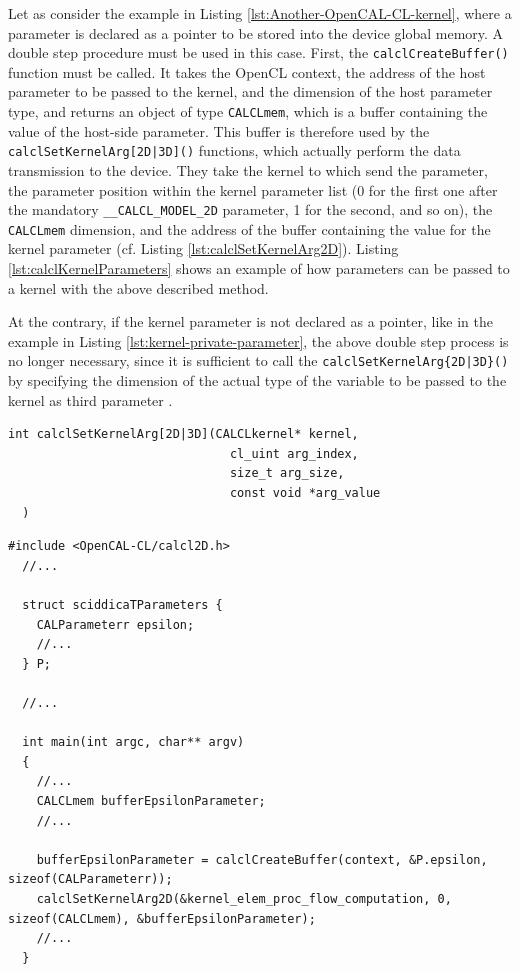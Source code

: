 Let as consider the example in Listing
\ref{lst:Another-OpenCAL-CL-kernel}, where a parameter is declared as
a pointer to be stored into the device global memory. A double step
procedure must be used in this case. First, the
\verb'calclCreateBuffer()' function must be called. It takes the
OpenCL context, the address of the host parameter to be passed to the
kernel, and the dimension of the host parameter type, and returns an
object of type \verb'CALCLmem', which is a buffer containing the value
of the host-side parameter. This buffer is therefore used by the
\verb'calclSetKernelArg[2D|3D]()' functions, which actually perform
the data transmission to the device. They take the kernel to which send
the parameter, the parameter position within the kernel parameter list
(0 for the first one after the mandatory \verb'__CALCL_MODEL_2D'
parameter, 1 for the second, and so on), the \verb'CALCLmem'
dimension, and the address of the buffer containing the value for the
kernel parameter (cf. Listing \ref{lst:calclSetKernelArg2D}). Listing \ref{lst:calclKernelParameters} shows an example of how
parameters can be passed to a kernel with the above described method.

At the contrary, if the kernel parameter is not declared as a pointer,
like in the example in Listing \ref{lst:kernel-private-parameter}, the
above double step process is no longer necessary, since it is
sufficient to call the \verb'calclSetKernelArg{2D|3D}()' by specifying
the dimension of the actual type of the variable to be passed to the
kernel as third parameter .


\begin{lstlisting}[float,floatplacement=H, label=lst:calclSetKernelArg2D, caption=The calclSetKernelArg2D() function., numbers=none]
  int calclSetKernelArg[2D|3D](CALCLkernel* kernel,
                               cl_uint arg_index,
                               size_t arg_size,
                               const void *arg_value
  )
\end{lstlisting}


\begin{lstlisting}[float,floatplacement=H, label=lst:calclKernelParameters, caption=Passing parametrs to kernel.]
  #include <OpenCAL-CL/calcl2D.h>
  //...

  struct sciddicaTParameters {
    CALParameterr epsilon;
    //...
  } P;

  //...

  int main(int argc, char** argv)
  {
    //...
    CALCLmem bufferEpsilonParameter;
    //...

    bufferEpsilonParameter = calclCreateBuffer(context, &P.epsilon, sizeof(CALParameterr));
    calclSetKernelArg2D(&kernel_elem_proc_flow_computation, 0, sizeof(CALCLmem), &bufferEpsilonParameter);
    //...
  }
\end{lstlisting}



